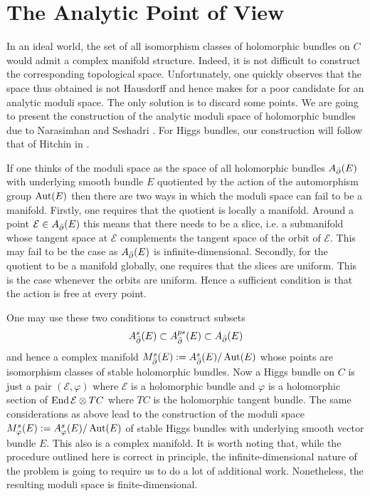 \documentclass[12pt]{ociamthesis}  %
\begin{document}
\section{The Analytic Point of View}

In an ideal world, the set of all isomorphism classes of holomorphic bundles
on $C$ would admit a complex manifold structure. Indeed, it is not difficult
to construct the corresponding topological space. Unfortunately, one
quickly observes that the space thus obtained is not Hausdorff and hence
makes for a poor candidate for an analytic moduli space.
The only solution is to discard some points. We are going to present
the construction of the analytic moduli space of holomorphic bundles
due to Narasimhan and Seshadri \cite{ns1964}. For Higgs bundles, our
construction will follow that of Hitchin in \cite{hitchin1987}.

If one thinks of the moduli space as the space of all holomorphic bundles
$A_{{\bar{\partial}}}(E)$ with underlying smooth bundle $E$ quotiented by the action
of the automorphism group $\operatorname{Aut}(E)$ then there are two ways in which
the moduli space can fail to be a manifold. Firstly, one requires that
the quotient is locally a manifold. Around a point $\mathcal E\in A_{\bar{\partial}}(E)$
this means that there needs to be a slice, i.e. a submanifold whose
tangent space at $\mathcal E$ complements the tangent space of the orbit
of $\mathcal E$. This may fail to be the case as $A_{\bar{\partial}}(E)$ is
infinite-dimensional. Secondly, for the quotient to be a manifold
globally, one requires that the slices are uniform. This is the case
whenever the orbits are uniform. Hence a sufficient condition is that
the action is free at every point.

One may use these two conditions to construct subsets
\begin{align*}
  A^s_{\bar{\partial}}(E) \subset A^{ps}_{\bar{\partial}}(E) \subset A_{\bar{\partial}}(E)
\end{align*}
and hence a complex manifold $M_{\bar{\partial}}^s(E) := A^s_{\bar{\partial}}(E) / \operatorname{Aut}(E)$
whose points are isomorphism classes of stable holomorphic bundles.
Now a Higgs bundle on $C$ is just a pair $(\mathcal E,\varphi)$
where $\mathcal E$ is a holomorphic bundle and $\varphi$ is a
holomorphic section of $\operatorname{End}\mathcal E\otimes TC$ where $TC$ is the
holomorphic tangent bundle. The same considerations as above lead to
the construction of the moduli space $M^s_\varphi(E) := A^s_\varphi(E)/\operatorname{Aut}(E)$
of stable Higgs bundles with underlying smooth vector bundle $E$. This also is a
complex manifold. It is worth noting that, while the procedure outlined
here is correct in principle, the infinite-dimensional nature of the
problem is going to require us to do a lot of additional work.
Nonetheless, the resulting moduli space is finite-dimensional.
\end{document}
